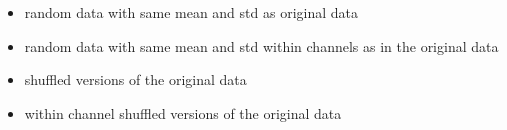 \begin{itemize}
	\item random data with same mean and std as original data
	\item random data with same mean and std within channels as in the original data
	\item shuffled versions of the original data
	\item within channel shuffled versions of the original data
\end{itemize}










